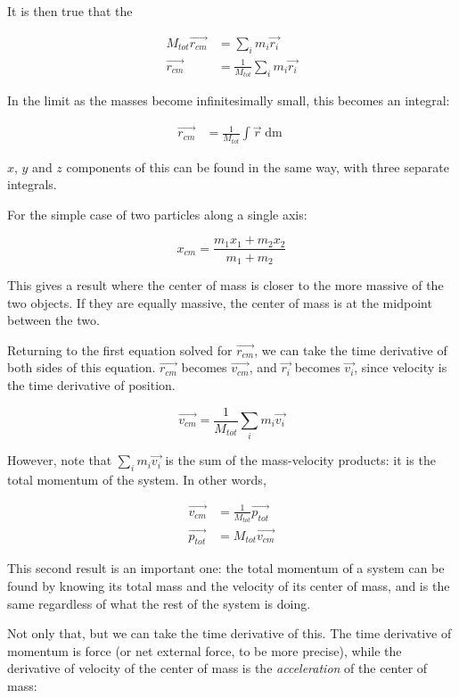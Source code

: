 It is then true that the 

\begin{align}
M_{tot} \vec{r_{cm}} &= \sum_i m_i \vec{r_i}\\
\vec{r_{cm}} &= \frac{1}{M_{tot}} \sum_i m_i \vec{r_i}
\end{align}

In the limit as the masses become infinitesimally small, this becomes an integral:

\begin{align}
\vec{r_{cm}} &= \frac{1}{M_{tot}} \int \vec{r} \mathop{dm}
\end{align}

$x$, $y$ and $z$ components of this can be found in the same way, with three separate integrals.

For the simple case of two particles along a single axis:

\begin{equation}
x_{cm} = \frac{m_1 x_1 + m_2 x_2}{m_1 + m_2}
\end{equation}

This gives a result where the center of mass is closer to the more massive of the two objects. If they are equally massive, the center of mass is at the midpoint between the two.

Returning to the first equation solved for $\vec{r_{cm}}$, we can take the time derivative of both sides of this equation. $\vec{r_{cm}}$ becomes $\vec{v_{cm}}$, and $\vec{r_i}$ becomes $\vec{v_i}$, since velocity is the time derivative of position.

\begin{equation}
\vec{v_{cm}} = \frac{1}{M_{tot}} \sum_i m_i \vec{v_i}
\end{equation}

However, note that $\sum_i m_i \vec{v_i}$ is the sum of the mass-velocity products: it is the total momentum of the system. In other words,

\begin{align}
\vec{v_{cm}} &= \frac{1}{M_{tot}} \vec{p_{tot}}\\
\vec{p_{tot}} &= M_{tot} \vec{v_{cm}}
\end{align}

This second result is an important one: the total momentum of a system can be found by knowing its total mass and the velocity of its center of mass, and is the same regardless of what the rest of the system is doing.

Not only that, but we can take the time derivative of this. The time derivative of momentum is force (or net external force, to be more precise), while the derivative of velocity of the center of mass is the \emph{acceleration} of the center of mass:

